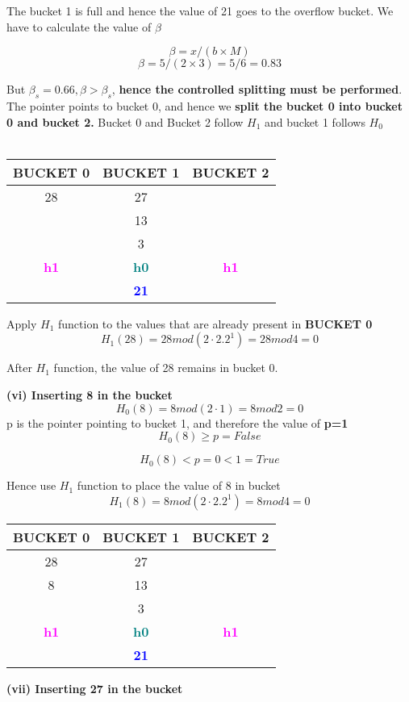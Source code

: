 The bucket 1 is full and hence the value of 21 goes to the overflow bucket. 
We have to calculate the value of $\beta$

\[\beta = x/(b \times M)\]
\[\beta = 5/(2 \times 3) = 5/6 = 0.83\]

But $\beta_s = 0.66 , \beta>\beta_s$,\textbf{ hence the controlled splitting must be performed}. The pointer points to bucket 0, and hence we \textbf{split the bucket 0 into bucket 0 and bucket 2.} Bucket 0 and Bucket 2 follow $H_1$ and bucket 1 follows $H_0$
\\
\\
\begin{center}
\begin{tabular}{ |c|c|c| } 
 \hline
 BUCKET 0 & \textbf{\color{red}{P}} BUCKET 1 & BUCKET 2\\ [0.5ex] 
 \hline\hline
 \hline
  28 & 27 & \\ 
   & 13 & \\
   & 3 & \\
 \hline
 \hline
\textbf{\textcolor{magenta}{h1}} & \textbf{\textcolor{teal}{h0}}& \textbf{\textcolor{magenta}{h1}}\\ [0.5ex] 
 \hline
     & \textbf{\textcolor{blue}{21}}
\end{tabular}
\end{center}
\newpage

Apply $H_1$ function to the values that are already present in \textbf{BUCKET 0}
\[H_1(28) = 28 mod (2 \cdot 2.2^1)  = 28 mod 4 = 0\]

After $H_1$ function, the value of 28 remains in bucket 0.


\textbf{(vi) Inserting 8 in the bucket}
\[H_0(8) = 8 mod (2 \cdot 1)  = 8 mod 2 = 0\]
    p is the pointer pointing to bucket 1, and therefore the value of \textbf{p=1}
\[H_0(8)\ge p = False\]

\[H_0(8) < p = 0 < 1 = True\]

Hence use $H_1$ function to place the value of 8 in bucket
\[H_1(8) = 8 mod (2 \cdot 2.2^1)  = 8 mod 4 = 0\]


\begin{center}
\begin{tabular}{ |c|c|c| } 
 \hline
 BUCKET 0 & \textbf{\color{red}{P}} BUCKET 1 & BUCKET 2\\ [0.5ex] 
 \hline\hline
 \hline
  28 & 27 & \\ 
   8 & 13 & \\
   & 3 & \\
 \hline
 \hline
\textbf{\textcolor{magenta}{h1}} & \textbf{\textcolor{teal}{h0}}& \textbf{\textcolor{magenta}{h1}}\\ [0.5ex] 
 \hline
     & \textbf{\textcolor{blue}{21}}
\end{tabular}
\end{center}
\textbf{(vii) Inserting 27 in the bucket}

